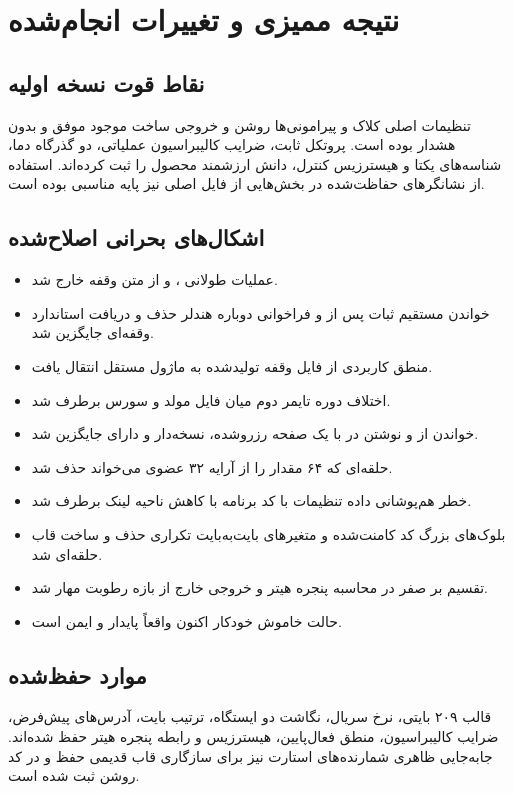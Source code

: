 \chapter{نتیجه ممیزی و تغییرات انجام‌شده}

\section{نقاط قوت نسخه اولیه}
تنظیمات اصلی کلاک و پیرامونی‌ها روشن و خروجی ساخت  موجود موفق و بدون هشدار بوده است. پروتکل ثابت، ضرایب کالیبراسیون عملیاتی، دو گذرگاه دما، شناسه‌های یکتا و هیسترزیس کنترل، دانش ارزشمند محصول را ثبت کرده‌اند. استفاده از نشانگرهای حفاظت‌شده  در بخش‌هایی از فایل اصلی نیز پایه مناسبی بوده است.

\section{اشکال‌های بحرانی اصلاح‌شده}
\begin{itemize}
  \item عملیات طولانی ،  و  از متن وقفه خارج شد.
  \item خواندن مستقیم ثبات  پس از  و فراخوانی دوباره هندلر حذف و دریافت استاندارد وقفه‌ای جایگزین شد.
  \item منطق کاربردی از فایل وقفه تولیدشده به ماژول مستقل انتقال یافت.
  \item اختلاف دوره تایمر دوم میان فایل مولد و سورس برطرف شد.
  \item خواندن از
و نوشتن در
با یک صفحه رزروشده، نسخه‌دار و دارای  جایگزین شد.
  \item حلقه‌ای که ۶۴ مقدار را از آرایه ۳۲ عضوی می‌خواند حذف شد.
  \item خطر هم‌پوشانی داده تنظیمات با کد برنامه با کاهش ناحیه لینک برطرف شد.
  \item بلوک‌های بزرگ کد کامنت‌شده و متغیرهای بایت‌به‌بایت تکراری حذف و ساخت قاب حلقه‌ای شد.
  \item تقسیم بر صفر در محاسبه پنجره هیتر و خروجی خارج از بازه رطوبت مهار شد.
  \item حالت خاموش خودکار اکنون واقعاً پایدار و ایمن است.
\end{itemize}

\section{موارد حفظ‌شده}
قالب ۲۰۹ بایتی، نرخ سریال، نگاشت دو ایستگاه، ترتیب بایت، آدرس‌های پیش‌فرض، ضرایب کالیبراسیون، منطق فعال‌پایین، هیسترزیس و رابطه پنجره هیتر حفظ شده‌اند. جابه‌جایی ظاهری شمارنده‌های استارت نیز برای سازگاری قاب قدیمی حفظ و در کد روشن ثبت شده است.

